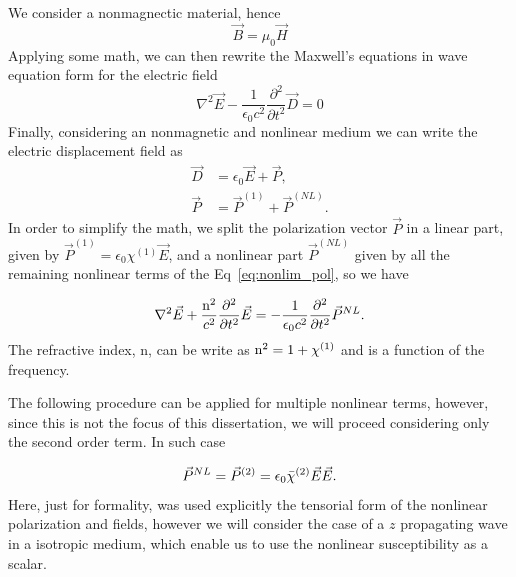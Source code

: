 We consider a nonmagnectic material, hence
\begin{equation}
    \vec{B} = \mu_0 \vec{H}
\end{equation}
%
Applying some math, we can then rewrite the Maxwell's equations in wave equation form for the electric field 
\begin{equation}
    \nabla^2\vec{E} - \frac{1}{\epsilon_0 c^2}\frac{\partial^2}{\partial t^2}\vec{D} = 0
\end{equation}
Finally, considering an nonmagnetic and nonlinear medium we can write the electric displacement field as
\begin{subequations}
    \begin{align}
        \vec{D} &= \epsilon_0\vec{E} +\vec{P},\\
        \vec{P} &= \vec{P}^{(1)} + \vec{P}^{(NL)}.
    \end{align}
\end{subequations}
In order to simplify the math, we split the polarization vector $\vec{P}$ in a linear part, given by $\vec{P}^{(1)} = \epsilon_0\chi^{(1)}\vec{E}$, and a nonlinear part $\vec{P}^{(NL)}$ given by all the remaining nonlinear terms of the Eq~\ref{eq:nonlim_pol}, so we have

\begin{equation}
    \nabla^2\vec{E} +\frac{\text{n}^2}{c^2}\frac{\partial^2}{\partial t^2}\vec{E} = -\frac{1}{\epsilon_0 c^2} \frac{\partial^2}{\partial t^2}\vec{P}^{NL}.
    \label{eq:wave_equation_nonlinear}
\end{equation}
The refractive index, n, can be write as $\text{n}^2= 1 + \chi^{(1)}$ and is a function of the frequency.

The following procedure can be applied for multiple nonlinear terms, however, since this is not the focus of this dissertation, we will proceed considering only the second order term. In such case

\begin{equation}
    \vec{P}^{NL} = \vec{P}^{(2)} = \epsilon_0\Bar{\chi}^{(2)}\vec{E}\vec{E}.
    \label{eq:nonlinear_polarization}
\end{equation}
Here, just for formality, was used explicitly the tensorial form of the nonlinear polarization and fields, however we will consider the case of a $z$ propagating wave in a isotropic medium, which enable us to use the nonlinear susceptibility as a scalar.

